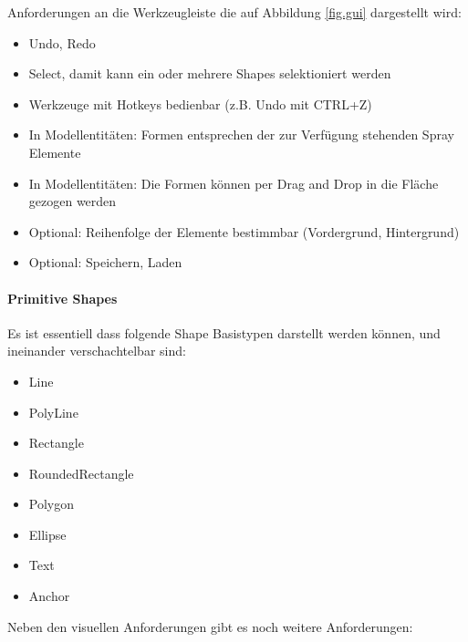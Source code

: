\noindent Anforderungen an die Werkzeugleiste die auf Abbildung
\ref{fig.gui} dargestellt wird:

\begin{itemize}
  \item Undo, Redo
  \item Select,  damit kann ein oder mehrere Shapes selektioniert werden
  \item Werkzeuge mit Hotkeys bedienbar (z.B. Undo mit CTRL+Z)
  \item In Modellentitäten: Formen entsprechen der zur Verfügung stehenden Spray Elemente
  \item In Modellentitäten: Die Formen können per Drag and Drop in die Fläche gezogen werden
  \item Optional: Reihenfolge der Elemente bestimmbar (Vordergrund, Hintergrund)
  \item Optional: Speichern, Laden
\end{itemize}


\paragraph{Primitive Shapes}

Es ist essentiell dass folgende Shape Basistypen darstellt werden können,
und ineinander verschachtelbar sind:

\begin{itemize}
  \item Line
  \item PolyLine
  \item Rectangle
  \item RoundedRectangle
  \item Polygon
  \item Ellipse
  \item Text
  \item Anchor
\end{itemize}

\noindent Neben den visuellen Anforderungen gibt es noch weitere Anforderungen:

